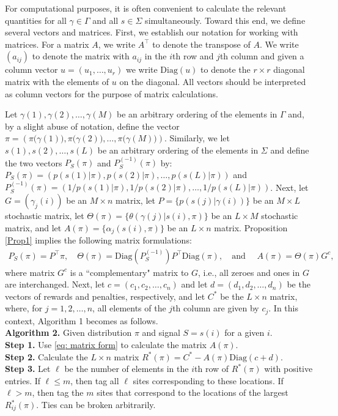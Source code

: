 \documentclass[a4paper,11pt]{article}
\newcommand{\Diag}{\mathrm{Diag} }
\begin{document}
For computational purposes, it is often convenient to calculate the relevant quantities for all $\gamma\in \Gamma$ and all $s\in\Sigma$ simultaneously. Toward this end, we define several vectors and matrices. First, we establish our notation for working with matrices. For a matrix $A$, we write $A^\top$ to denote the transpose of $A$. We write $(a_{ij})$ to denote the matrix with $a_{ij}$ in the $i$th row and $j$th column and given a column vector $u=(u_1,\dots,u_r)$ we write $\Diag(u)$ to denote the $r\times r$ diagonal matrix with the elements of $u$ on the diagonal. All vectors should be interpreted as column vectors for the purpose of matrix calculations.

Let $\gamma{(1)},\gamma{(2)},\dots,\gamma{(M)}$ be an arbitrary ordering of the elements in $\Gamma$ and, by a slight abuse of notation, define the vector $\pi = \left(\pi\big(\gamma{(1)}\big),\pi\big(\gamma{(2)}\big),\dots, \pi\big(\gamma{(M)}\big)\right)$. Similarly, we let $s{(1)},s{(2)},\dots,s{(L)}$ be an arbitrary ordering of the elements in $\Sigma$ and define the two  vectors $P_S(\pi)$ and $P_{S}^{(-1)}(\pi)$ by: $P_S(\pi) = \left(p(s{(1)}|\pi),p(s{(2)}|\pi), \dots,p(s{(L)}|\pi)\right)$ and $P_{S}^{(-1)}(\pi) = \left(1/p(s{(1)}|\pi),1/p(s{(2)}|\pi),\dots,1/p(s{(L)}|\pi)\right)$. Next, let $G=(\gamma_j{(i)})$ be an $M\times n$ matrix, let $P=\{p(s{(j)}|\gamma{(i)})\}$ be an $M\times L$ stochastic matrix, let $\Theta(\pi)=\{\theta(\gamma{(j)}|s{(i)},\pi)\}$ be an $L\times M$ stochastic matrix, and let $A(\pi)=\{\alpha_j(s{(i)},\pi)\}$ be an $L\times n$ matrix. Proposition \ref{Prop1} implies the following matrix formulations:
\begin{eqnarray}\label{eq: matrix form}
P_S(\pi)=P^\top\pi, \quad \Theta(\pi)=\Diag(P_{S}^{(-1)})P^\top\Diag(\pi), \quad \mbox{and }\quad A(\pi)=\Theta(\pi)G^c,
\end{eqnarray}
where matrix $G^c$ is a ``complementary" matrix to $G$, i.e., all zeroes and ones in $G$ are interchanged. Next, let $c=(c_1,c_2,\dots,c_n)$ and let $d=(d_1,d_2,\dots,d_n)$ be the vectors of rewards and penalties, respectively, and let $C^*$ be the $L\times n$ matrix, where, for $j=1,2,\dots,n$, all elements of the $j$th column are given by $c_j$. In this context, Algorithm 1 becomes as follows.\\

\noindent\textbf{Algorithm 2.} Given distribution $\pi$ and signal $S=s(i)$ for a given $i$.\\
\textbf{Step 1.} Use \eqref{eq: matrix form} to calculate the matrix $A(\pi)$.\\
\textbf{Step 2.} Calculate the $L\times n$ matrix $R^*(\pi) = C^* -A(\pi)\Diag(c+d)$.\\
\textbf{Step 3.} Let $\ell$ be the number of elements in the $i$th row of $R^*(\pi)$ with positive entries.  If $\ell\le m$, then tag all $\ell$ sites corresponding to these locations. If $\ell>m$, then tag the $m$ sites that correspond to the locations of the largest $R^*_{ij}(\pi)$. Ties can be broken arbitrarily.\\
\end{document}
